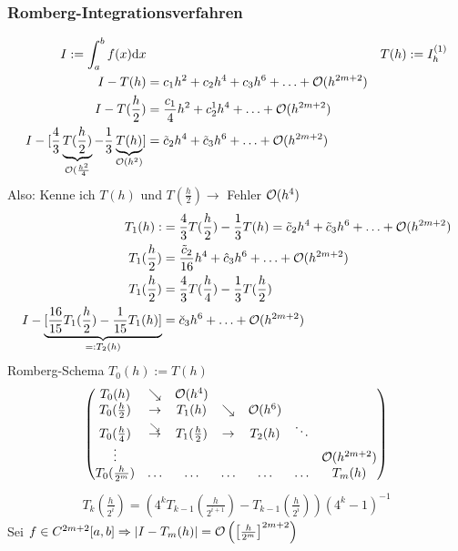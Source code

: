 \subsubsection{Romberg-Integrationsverfahren}
\begin{align*}
  I := \int_a^b f(x) \mathrm{d}x && T(h) := I_h^{(1)}\\
  I-T(h) &= c_1h^2 + c_2h^4+c_3h^6+\ldots+\mathcal{O}(h^{2m+2})\\
  I-T(\frac{h}{2}) &= \frac{c_1}{4} h^2 + c_2^1h^4+\ldots+\mathcal{O}(h^{2m+2})\\
  I-[\frac{4}{3} \underbrace{T(\frac{h}{2})}_{\mathcal{O}(\frac{h^2}{4}} - \frac{1}{3} \underbrace{T(h)}_{\mathcal{O}(h^2)} ] &= \tilde{c}_2h^4 + \tilde{c}_3h^6 + \ldots + \mathcal{O}(h^{2m+2})
\end{align*}
Also: Kenne ich $T(h)$ und $T(\frac{h}{2})\rightarrow$ Fehler $\mathcal{O}(h^4)$
\begin{align*}
  T_1(h) :&= \frac{4}{3} T(\frac{h}{2}) - \frac{1}{3} T(h) = \tilde{c}_2h^4 + \tilde{c}_3h^6 + \ldots + \mathcal{O}(h^{2m+2})\\
  T_1(\frac{h}{2}) &= \frac{\tilde{c}_2}{16} h^4 + \hat{c}_3 h^6 + \ldots + \mathcal{O}(h^{2m+2})\\
  T_1(\frac{h}{2}) &= \frac{4}{3} T(\frac{h}{4}) - \frac{1}{3} T(\frac{h}{2})\\
  I-\underbrace{[\frac{16}{15} T_1(\frac{h}{2}) - \frac{1}{15} T_1(h)]}_{=: T_2(h)} &= \breve{c}_3 h^6 + \ldots + \mathcal{O}(h^{2m+2})
\end{align*}
Romberg-Schema $T_0(h) := T(h)$
\begin{align*}
  \begin{pmatrix}
    T_0(h)                & \searrow    & \LandauO(h^4)    &             &               &           &\\
    T_0(\frac{h}{2})      & \rightarrow & T_1(h)           & \searrow    & \LandauO(h^6) &           &\\
    T_0(\frac{h}{4})      & \esearrow & T_1(\frac{h}{2}) & \rightarrow & T_2(h)        &  \ddots     &\\
    \vdots                &             &                  &             &               &           & \LandauO(h^{2m+2})\\
    T_0(\frac{h}{2^m})    & \ldots      & \ldots           & \ldots      &      \ldots   &  \ldots   & T_m(h) \\ %
  \end{pmatrix}
\end{align*}
\begin{align*}
  T_k\left(\frac{h}{2^i}\right) = \left( 4^k T_{k-1}\left(\frac{h}{2^{i+1}} \right) - T_{k-1}\left(\frac{h}{2^i} \right) \right) \left(4^k-1\right)^{-1}
\end{align*}
 Sei $f \in C^{2m+2}[a,b] \Rightarrow \left| I-T_m(h) \right| = \mathcal{O}\left(\left[\frac{h}{2^m} \right]^{2m+2} \right)$

